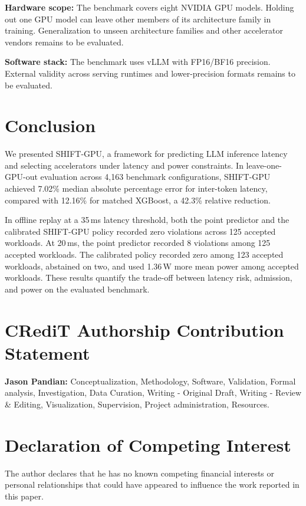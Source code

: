 \documentclass[preprint,12pt]{elsarticle}
\begin{document}
\textbf{Hardware scope:}
The benchmark covers eight NVIDIA GPU models. Holding out one GPU
model can leave other members of its architecture family in training.
Generalization to unseen architecture families and other accelerator
vendors remains to be evaluated.

\textbf{Software stack:}
The benchmark uses vLLM with FP16/BF16 precision. External validity
across serving runtimes and lower-precision formats remains to be
evaluated.

\section{Conclusion}
\label{sec:conclusion}

We presented SHIFT-GPU, a framework for predicting LLM inference
latency and selecting accelerators under latency and power constraints.
In leave-one-GPU-out evaluation across 4,163 benchmark configurations,
SHIFT-GPU achieved 7.02\% median absolute percentage error for
inter-token latency, compared with 12.16\% for matched XGBoost,
a 42.3\% relative reduction.

In offline replay at a 35\,ms latency threshold, both the point
predictor and the calibrated SHIFT-GPU policy recorded zero violations
across 125 accepted workloads. At 20\,ms, the point predictor recorded
8 violations among 125 accepted workloads. The calibrated policy
recorded zero among 123 accepted workloads, abstained on two, and
used 1.36\,W more mean power among accepted workloads. These results
quantify the trade-off between latency risk, admission, and power
on the evaluated benchmark.

\section*{CRediT Authorship Contribution Statement}
\textbf{Jason Pandian:} Conceptualization, Methodology, Software, Validation, Formal analysis, Investigation, Data Curation, Writing - Original Draft, Writing - Review \& Editing, Visualization, Supervision, Project administration, Resources.

\section*{Declaration of Competing Interest}
The author declares that he has no known competing financial interests or personal relationships that could have appeared to influence the work reported in this paper.
\end{document}
